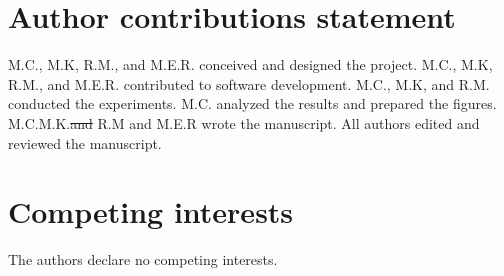 \documentclass[fleqn,10pt]{wlscirep}
\providecommand{\DIFadd}[1]{{\protect\color{blue}\uwave{#1}}} %
\providecommand{\DIFdel}[1]{{\protect\color{red}\sout{#1}}}                      %
\providecommand{\DIFaddbegin}{} %
\providecommand{\DIFaddend}{} %
\providecommand{\DIFdelbegin}{} %
\providecommand{\DIFdelend}{} %
\begin{document}
\section*{Author contributions statement}

M.C., M.K, R.M., and M.E.R. conceived and designed the project.
M.C., M.K, R.M., and M.E.R. contributed to software development. 
M.C., M.K, and R.M. conducted the experiments.
M.C. analyzed the results and prepared the figures.
M.C.\DIFaddbegin \DIFadd{, }\DIFaddend M.K.\DIFdelbegin \DIFdel{and }\DIFdelend \DIFaddbegin \DIFadd{, }\DIFaddend R.M and M.E.R wrote the manuscript. 
All authors edited and reviewed the manuscript.

\section*{Competing interests}

The authors declare no competing interests.
\DIFdelbegin %

\DIFdelend 



\end{document}
